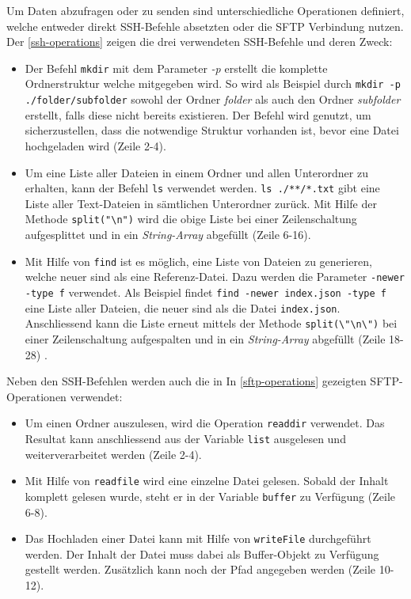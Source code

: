 Um Daten abzufragen oder zu senden sind unterschiedliche Operationen definiert, welche entweder direkt \gls{SSH}-Befehle absetzten oder die \gls{SFTP} Verbindung nutzen.
Der \autoref{ssh-operations} zeigen die drei verwendeten \gls{SSH}-Befehle und deren Zweck:
\begin{itemize}
    \item Der Befehl \texttt{mkdir} mit dem Parameter \textit{-p} erstellt die komplette Ordnerstruktur welche mitgegeben wird. So wird als Beispiel durch \verb|mkdir -p ./folder/subfolder| sowohl der Ordner \textit{folder} als auch den Ordner \textit{subfolder} erstellt, falls diese nicht bereits existieren. Der Befehl wird genutzt, um sicherzustellen, dass die notwendige Struktur vorhanden ist, bevor eine Datei hochgeladen wird (Zeile 2-4).
    \item Um eine Liste aller Dateien in einem Ordner und allen Unterordner zu erhalten, kann der Befehl \texttt{ls} verwendet werden. \verb|ls ./**/*.txt| gibt eine Liste aller Text-Dateien in sämt\-lich\-en Unterordner zurück. Mit Hilfe der Methode \verb|split("\n")| wird die obige Liste bei einer Zeilenschaltung aufgesplittet und in ein \textit{String-Array} abgefüllt (Zeile 6-16).
    \item Mit Hilfe von \texttt{find} ist es möglich, eine Liste von Dateien zu generieren, welche neuer sind als eine Referenz-Datei. Dazu werden die Parameter \texttt{-newer -type f} verwendet. Als Beispiel findet \texttt{find -newer index.json -type f} eine Liste aller Dateien, die neuer sind als die Datei \texttt{index.json}. Anschliessend kann die Liste erneut mittels der Methode \verb|split(\"\n\")| bei einer Zeilenschaltung aufgespalten und in ein \textit{String-Array} abgefüllt (Zeile 18-28) .
\end{itemize}



Neben den \gls{SSH}-Befehlen werden auch die in
In \autoref{sftp-operations} gezeigten \gls{SFTP}-Operationen verwendet:
\begin{itemize}
    \item Um einen Ordner auszulesen, wird die Operation \texttt{readdir} verwendet. Das Resultat kann anschliessend aus der Variable \texttt{list} ausgelesen und weiterverarbeitet werden (Zeile 2-4).\\
    \item Mit Hilfe von \texttt{readfile} wird eine einzelne Datei gelesen. Sobald der Inhalt komplett gelesen wurde, steht er in der Variable \texttt{buffer} zu Verfügung (Zeile 6-8).\\
    \item Das Hochladen einer Datei kann mit Hilfe von \texttt{writeFile} durchgeführt werden. Der Inhalt der Datei muss dabei als \gls{Buffer}-Objekt zu Verfügung gestellt werden. Zusätzlich kann noch der Pfad angegeben werden (Zeile 10-12).\\
\end{itemize}

